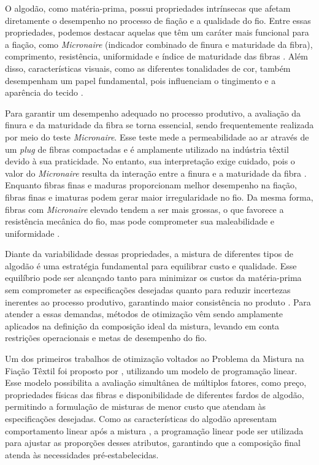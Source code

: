 \documentclass[
    12pt,                %
    openright,           %
    oneside,             %
    a4paper,             %
    english,             %
    spanish,             %
    brazil               %
]{ufscar}
\begin{document}
O algodão, como matéria-prima, possui propriedades intrínsecas que afetam diretamente o desempenho no processo de fiação e a qualidade do fio. Entre essas propriedades, podemos destacar aquelas que têm um caráter mais funcional para a fiação, como \textit{Micronaire} (indicador combinado de finura e maturidade da fibra), comprimento, resistência, uniformidade e índice de maturidade das fibras \cite{waters_effect_1961}. Além disso, características visuais, como as diferentes tonalidades de cor, também desempenham um papel fundamental, pois influenciam o tingimento e a aparência do tecido \cite{fang_physical_2018}.

Para garantir um desempenho adequado no processo produtivo, a avaliação da finura e da maturidade da fibra se torna essencial, sendo frequentemente realizada por meio do teste \textit{Micronaire}. Esse teste mede a permeabilidade ao ar através de um \textit{plug} de fibras compactadas e é amplamente utilizado na indústria têxtil devido à sua praticidade. No entanto, sua interpretação exige cuidado, pois o valor do \textit{Micronaire} resulta da interação entre a finura e a maturidade da fibra \cite{lord19562}. Enquanto fibras finas e maduras proporcionam melhor desempenho na fiação, fibras finas e imaturas podem gerar maior irregularidade no fio. Da mesma forma, fibras com \textit{Micronaire} elevado tendem a ser mais grossas, o que favorece a resistência mecânica do fio, mas pode comprometer sua maleabilidade e uniformidade \cite{montalvo2005relationships}.

Diante da variabilidade dessas propriedades, a mistura de diferentes tipos de algodão é uma estratégia fundamental para equilibrar custo e qualidade. Esse equilíbrio pode ser alcançado tanto para minimizar os custos da matéria-prima sem comprometer as especificações desejadas quanto para reduzir incertezas inerentes ao processo produtivo, garantindo maior consistência no produto \cite{takahashi_2016}. Para atender a essas demandas, métodos de otimização vêm sendo amplamente aplicados na definição da composição ideal da mistura, levando em conta restrições operacionais e metas de desempenho do fio.

Um dos primeiros trabalhos de otimização voltados ao Problema da Mistura na Fiação Têxtil foi proposto por , utilizando um modelo de programação linear. Esse modelo possibilita a avaliação simultânea de múltiplos fatores, como preço, propriedades físicas das fibras e disponibilidade de diferentes fardos de algodão, permitindo a formulação de misturas de menor custo que atendam às especificações desejadas. Como as características do algodão apresentam comportamento linear após a mistura \cite{waters_effect_1961}, a programação linear pode ser utilizada para ajustar as proporções desses atributos, garantindo que a composição final atenda às necessidades pré-estabelecidas.
\end{document}
